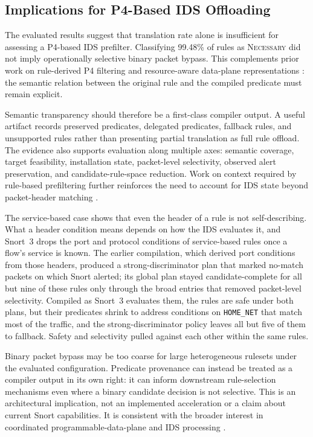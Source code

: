 \documentclass{article}
\begin{document}
\subsection{Implications for P4-Based IDS Offloading}
The evaluated results suggest that translation rate alone is insufficient for
assessing a P4-based IDS prefilter. Classifying 99.48\% of rules as
\textsc{Necessary} did not imply operationally selective binary packet
bypass. This complements prior work on rule-derived P4 filtering and
resource-aware data-plane representations \cite{lewis2019p4id,tavares2021p4onids}:
the semantic relation between the original rule and the compiled predicate
must remain explicit.

Semantic transparency should therefore be a first-class compiler output. A
useful artifact records preserved predicates, delegated predicates, fallback
rules, and unsupported rules rather than presenting partial translation as
full rule offload. The evidence also supports evaluation along multiple axes:
semantic coverage, target feasibility, installation state, packet-level
selectivity, observed alert preservation, and candidate-rule-space reduction.
Work on context required by rule-based prefiltering further reinforces the
need to account for IDS state beyond packet-header matching \cite{brum2025rethinking}.

The service-based case shows that even the header of a rule is not
self-describing. What a header condition means depends on how the IDS
evaluates it, and Snort~3 drops the port and protocol conditions of
service-based rules once a flow's service is known. The earlier compilation,
which derived port conditions from those headers, produced a
strong-discriminator plan that marked no-match packets on which Snort
alerted; its global plan stayed candidate-complete for all but nine of these
rules only through the broad entries that removed packet-level selectivity.
Compiled as Snort~3 evaluates them, the rules are safe under both plans, but
their predicates shrink to address conditions on \texttt{HOME\_NET} that
match most of the traffic, and the strong-discriminator policy leaves all
but five of them to fallback. Safety and selectivity pulled against each other within the
same rules.

Binary packet bypass may be too coarse for large heterogeneous rulesets under
the evaluated configuration. Predicate provenance can instead be treated as
a compiler output in its own right: it can inform downstream rule-selection
mechanisms even where a binary candidate decision is not selective. This is
an architectural implication, not an implemented acceleration or a claim
about current Snort capabilities. It is consistent with the broader interest
in coordinated programmable-data-plane and IDS processing
\cite{hagen2025rna}.
\end{document}
